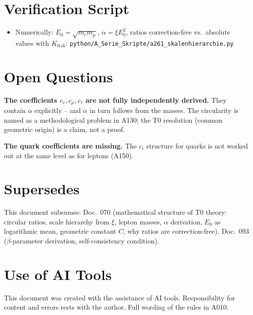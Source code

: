\section{Verification Script}

\begin{itemize}[leftmargin=2em,itemsep=2pt,topsep=2pt]
  \item Numerically: $E_0=\sqrt{m_em_\mu}$, $\alpha=\xi E_0^2$, ratios
    correction-free vs.\ absolute values with $K_\text{frak}$:
    \texttt{python/A\_Serie\_Skripte/a261\_skalenhierarchie.py}
\end{itemize}

\section{Open Questions}

\textbf{The coefficients $c_e,c_\mu,c_\tau$ are not fully independently derived.}
They contain $\alpha$ explicitly -- and $\alpha$ in turn follows from the masses.
The circularity is named as a methodological problem in A130; the T0 resolution
(common geometric origin) is a claim, not a proof.

\textbf{The quark coefficients are missing.} The $c_i$ structure for quarks is
not worked out at the same level as for leptons (A150).

\section{Supersedes}

This document subsumes: Doc.~070 (mathematical structure of T0 theory: circular
ratios, scale hierarchy from $\xi$, lepton masses, $\alpha$ derivation, $E_0$ as
logarithmic mean, geometric constant $C$, why ratios are correction-free).
Doc.~093 ($\beta$-parameter derivation, self-consistency condition).

\section{Use of AI Tools}

This document was created with the assistance of AI tools. Responsibility
for content and errors rests with the author. Full wording of the rules in A010.
